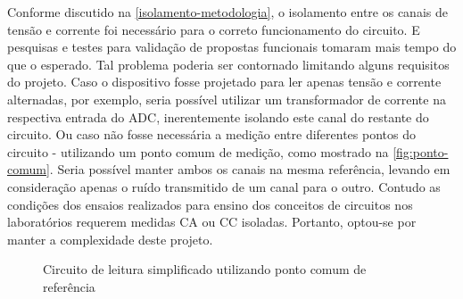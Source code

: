 Conforme discutido na \autoref{isolamento-metodologia}, o isolamento entre os canais de tensão e corrente foi necessário para o correto funcionamento do circuito. E pesquisas e testes para validação de propostas funcionais tomaram mais tempo do que o esperado.
Tal problema poderia ser contornado limitando alguns requisitos do projeto. 
Caso o dispositivo fosse projetado para ler apenas tensão e corrente alternadas, por exemplo, seria possível utilizar um transformador de corrente na respectiva entrada do \gls{ADC}, inerentemente isolando este canal do restante do circuito. 
Ou caso não fosse necessária a medição entre diferentes pontos do circuito - utilizando um ponto comum de medição, como mostrado na \autoref{fig:ponto-comum}. Seria possível manter ambos os canais na mesma referência, levando em consideração apenas o ruído transmitido de um canal para o outro. Contudo as condições dos ensaios realizados para ensino dos conceitos de circuitos nos laboratórios requerem medidas \gls{CA} ou \gls{CC} isoladas. Portanto, optou-se por manter a complexidade deste projeto.

\begin{figure}[h!]
    \centering
    \caption{Circuito de leitura simplificado utilizando ponto comum de referência}
    \vspace*{5mm}
    \label{fig:ponto-comum}
    \fonte{}
\end{figure}

